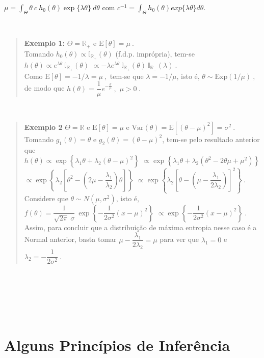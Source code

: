 \documentclass[
]{book}
\begin{document}
\(\mu = \displaystyle \int_\Theta \theta~c~ h_0(\theta)\exp\{\lambda\theta\}~d\theta\) com \(c^{-1}=\displaystyle\int_\Theta h_0(\theta)exp\{\lambda \theta\}d\theta\).

\(~\)

\begin{quote}
\textbf{Exemplo 1:} \(\Theta = \mathbb{R}_+\) e \(\text{E}[\theta]=\mu~.\)\\
Tomando \(h_0(\theta) \propto \mathbb{I}_{\mathbb{R}_+}(\theta)\) (f.d.p. imprópria), tem-se \(h(\theta )\propto e^{\lambda\theta}~\mathbb{I}_{\mathbb{R}_+}(\theta)\) \(\propto-\lambda e^{\lambda\theta}~\mathbb{I}_{\mathbb{R}_+}(\theta)~\mathbb{I}_{\mathbb{R}_-}(\lambda)~.\)\\
Como \(\text{E}[\theta]=-1/\lambda =\mu~,\) tem-se que \(\lambda= -1/\mu\), isto é, \(\theta\sim\text{Exp}(1/\mu)~,\) de modo que \(h(\theta)=\dfrac{1}{\mu}e^{-\frac{\theta}{\mu}}~,\) \(\mu>0~.\)
\end{quote}

\(~\)

\begin{quote}
\textbf{Exemplo 2} \(\Theta = \mathbb{R}\) e \(\text{E}[\theta]=\mu\) e \(\text{Var}(\theta)=\text{E}[(\theta-\mu)^2]=\sigma^2~.\)\\
Tomando \(g_1(\theta)=\theta\) e \(g_2(\theta)=(\theta-\mu)^2\), tem-se pelo resultado anterior que\\
\(h(\theta) \propto \exp\left\{\lambda_1\theta+\lambda_2(\theta-\mu)^2\right\}\)
\(\propto \exp\left\{\lambda_1\theta+\lambda_2(\theta^2-2\theta\mu+\mu^2)\right\}\)
\(\propto \exp\left\{\lambda_2\left[\theta^2-\left(2\mu-\dfrac{\lambda_1}{\lambda_2}\right)\theta\right]\right\}\)
\(\propto \exp\left\{\lambda_2\left[\theta-\left(\mu-\dfrac{\lambda_1}{2\lambda_2}\right)\right]^2\right\}~.\)\\
Considere que \(\theta\sim N(\mu,\sigma^2)\), isto é, \(f(\theta)=\dfrac{1}{\sqrt{2\pi}~\sigma}~\exp\left\{-\dfrac{1}{2\sigma^2}(x-\mu)^2\right\}\) \(\propto \exp\left\{-\dfrac{1}{2\sigma^2}(x-\mu)^2\right\}~.\)\\
Assim, para concluir que a distribuição de máxima entropia nesse caso é a Normal anterior, basta tomar \(\mu-\dfrac{\lambda_1}{2\lambda_2}=\mu\) para ver que \(\lambda_1=0\) e \(\lambda_2=-\dfrac{1}{2\sigma^2}~.\)
\end{quote}

\(~\)

\(~\)

\(~\)

\hypertarget{alguns-princuxedpios-de-inferuxeancia}{%
\section{Alguns Princípios de Inferência}\label{alguns-princuxedpios-de-inferuxeancia}}
\end{document}
